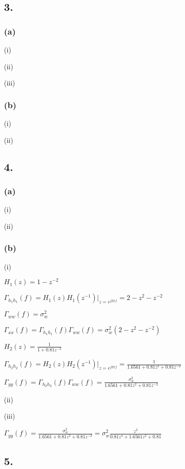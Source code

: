 \documentclass{article}
\begin{document}
\subsection*{3.}
\subsubsection*{(a)}
(i)\par
(ii)\par
(iii)\par
\subsubsection*{(b)}
(i)\par
(ii)\par

\subsection*{4.}
\subsubsection*{(a)}
(i)\par
(ii)\par
\subsubsection*{(b)}
(i)\par
$H_{1}(z)=1-z^{-2}$\par
$\Gamma_{h_{1}h_{1}}(f)=H_{1}(z)H_{1}(z^{-1})|_{z=e^{j2\pi f}}=2-z^{2}-z^{-2}$\par
$\Gamma_{ww}(f)=\sigma_{w}^2$\par
$\Gamma_{xx}(f)=\Gamma_{h_{1}h_{1}}(f)\Gamma_{ww}(f)=\sigma_{w}^2(2-z^{2}-z^{-2})$\par
$H_{2}(z)=\frac{1}{1+0.81z^{-2}}$\par
$\Gamma_{h_{2}h_{2}}(f)=H_{2}(z)H_{2}(z^{-1})|_{z=e^{j2\pi f}}=\frac{1}{1.6561+0.81z^{2}+0.81z^{-2}}$\par
$\Gamma_{yy}(f)=\Gamma_{h_{2}h_{2}}(f)\Gamma_{ww}(f)=\frac{\sigma_{w}^2}{1.6561+0.81z^{2}+0.81z^{-2}}$\par
(ii)\par
(iii)\par
$\Gamma_{yy}(f)=\frac{\sigma_{w}^2}{1.6561+0.81z^{2}+0.81z^{-2}}=\sigma_{w}^2\frac{z^{2}}{0.81z^{4}+1.6561z^{2}+0.81}$\par

\subsection*{5.}
\end{document}
